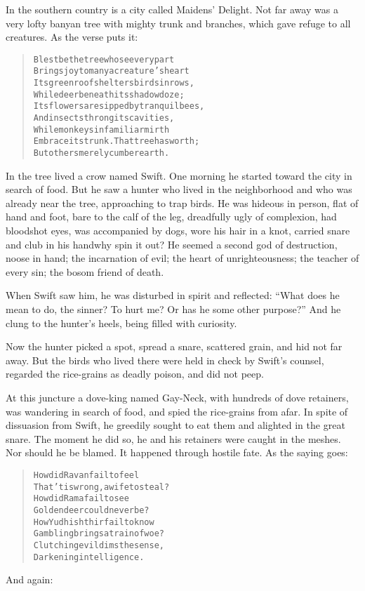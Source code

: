 \documentclass[article, twoside, 14pt]{memoir}
\renewenvironment{verbatim}{%
\begin{quote}%
\vskip -10pt%
\begin{alltt}\normalfont\large}{\end{alltt}%
\end{quote}%
\vskip -10pt
} %
\begin{document}
In the southern country is a city called Maidens'
\label{s36}Delight. Not far away was a very lofty banyan tree with
mighty trunk and branches, which gave refuge to all creatures. As
the verse puts it:

\begin{verbatim}
Blest be the tree whose every part
Brings joy to many a creature's heart{\textemdash}
Its green roof shelters birds in rows,
While deer beneath its shadow doze;
Its flowers are sipped by tranquil bees,
And insects throng its cavities,
While monkeys in familiar mirth
Embrace its trunk. That tree has worth;
But others merely cumber earth.
\end{verbatim}
In the tree lived a crow named Swift. One morning he started toward
the city in search of food. But he saw a hunter who lived in the
neighborhood and who was already near the tree, approaching to trap
birds. He was hideous in person, flat of hand and foot, bare to the
calf of the leg, dreadfully ugly of complexion, had bloodshot eyes,
was accompanied by dogs, wore his hair in a knot, carried snare and
club in his hand{\textemdash}why spin it out? He seemed a second god of
destruction, noose in hand; the incarnation of evil; the heart of
unrighteousness; the teacher of every sin; the bosom friend of
death.

When Swift saw him, he was disturbed in spirit and reflected:
``What does he mean to do, the sinner? To hurt me? Or has he some other purpose?''
And he clung to the hunter's heels, being filled with curiosity.

Now the hunter picked a spot, spread a snare, scattered grain, and
hid not far away. But the birds who lived there were held in check
by Swift's counsel, regarded the rice-grains as deadly poison, and
did not peep.

At this juncture a dove-king named Gay-Neck, with hundreds of dove
retainers, was wandering in search of food, and spied the
rice-grains from afar. In spite of dissuasion from Swift, he
greedily sought to eat them and alighted in the great snare.
The moment he did so, he and his retainers were caught in the
meshes. Nor should he be blamed. It happened through hostile fate.
As the saying goes:

\begin{verbatim}
How did Ravan fail to feel
That 'tis wrong, a wife to steal?
How did Rama fail to see
Golden deer could never be?
How Yudhishthir fail to know
Gambling brings a train of woe?
Clutching evil dims the sense,
Darkening intelligence.
\end{verbatim}
And again:
\end{document}
